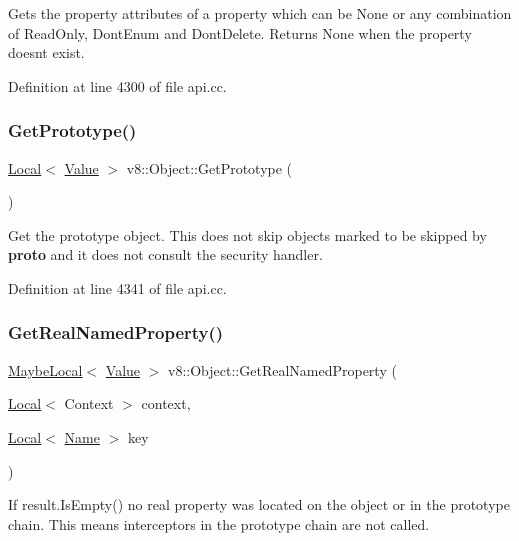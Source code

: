 Gets the property attributes of a property which can be None or any combination of Read\+Only, Dont\+Enum and Dont\+Delete. Returns None when the property doesn\textquotesingle{}t exist. 

Definition at line 4300 of file api.\+cc.

\mbox{\label{classv8_1_1Object_a684cd61c13957c5b90c0ea0a50749dd1}} 
\subsubsection{\texorpdfstring{Get\+Prototype()}{GetPrototype()}}
{\footnotesize\ttfamily \mbox{\hyperlink{classv8_1_1Local}{Local}}$<$ \mbox{\hyperlink{classv8_1_1Value}{Value}} $>$ v8\+::\+Object\+::\+Get\+Prototype (\begin{DoxyParamCaption}{ }\end{DoxyParamCaption})}

Get the prototype object. This does not skip objects marked to be skipped by {\bfseries proto} and it does not consult the security handler. 

Definition at line 4341 of file api.\+cc.

\mbox{\label{classv8_1_1Object_a2b2061b69658173b3b7e39ee3ca1f394}} 
\subsubsection{\texorpdfstring{Get\+Real\+Named\+Property()}{GetRealNamedProperty()}}
{\footnotesize\ttfamily \mbox{\hyperlink{classv8_1_1MaybeLocal}{Maybe\+Local}}$<$ \mbox{\hyperlink{classv8_1_1Value}{Value}} $>$ v8\+::\+Object\+::\+Get\+Real\+Named\+Property (\begin{DoxyParamCaption}\item[{\mbox{\hyperlink{classv8_1_1Local}{Local}}$<$ Context $>$}]{context,  }\item[{\mbox{\hyperlink{classv8_1_1Local}{Local}}$<$ \mbox{\hyperlink{classv8_1_1Name}{Name}} $>$}]{key }\end{DoxyParamCaption})}

If result.\+Is\+Empty() no real property was located on the object or in the prototype chain. This means interceptors in the prototype chain are not called. 

